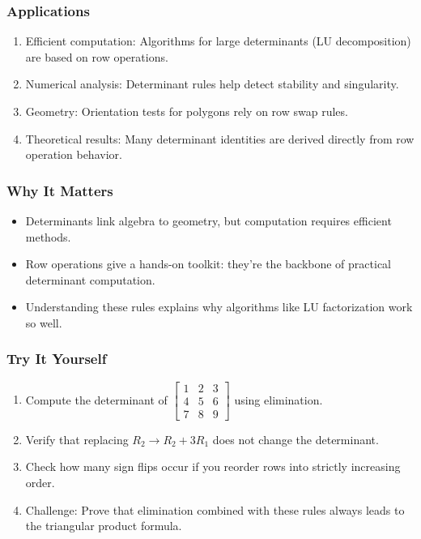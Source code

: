 \documentclass[
  letterpaper,
  DIV=11,
  numbers=noendperiod]{scrreprt}
\providecommand{\tightlist}{%
  \setlength{\itemsep}{0pt}\setlength{\parskip}{0pt}}
\begin{document}
\subsubsection{Applications}\label{applications-15}

\begin{enumerate}
\def\labelenumi{\arabic{enumi}.}
\tightlist
\item
  Efficient computation: Algorithms for large determinants (LU
  decomposition) are based on row operations.
\item
  Numerical analysis: Determinant rules help detect stability and
  singularity.
\item
  Geometry: Orientation tests for polygons rely on row swap rules.
\item
  Theoretical results: Many determinant identities are derived directly
  from row operation behavior.
\end{enumerate}

\subsubsection{Why It Matters}\label{why-it-matters-49}

\begin{itemize}
\tightlist
\item
  Determinants link algebra to geometry, but computation requires
  efficient methods.
\item
  Row operations give a hands-on toolkit: they're the backbone of
  practical determinant computation.
\item
  Understanding these rules explains why algorithms like LU
  factorization work so well.
\end{itemize}

\subsubsection{Try It Yourself}\label{try-it-yourself-52}

\begin{enumerate}
\def\labelenumi{\arabic{enumi}.}
\tightlist
\item
  Compute the determinant of
  \(\begin{bmatrix} 1 & 2 & 3 \\ 4 & 5 & 6 \\ 7 & 8 & 9 \end{bmatrix}\)
  using elimination.
\item
  Verify that replacing \(R_2 \to R_2 + 3R_1\) does not change the
  determinant.
\item
  Check how many sign flips occur if you reorder rows into strictly
  increasing order.
\item
  Challenge: Prove that elimination combined with these rules always
  leads to the triangular product formula.
\end{enumerate}
\end{document}
